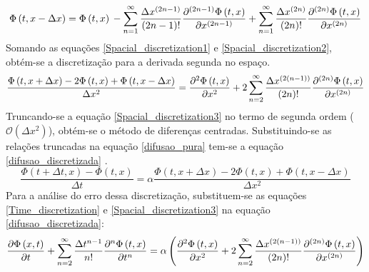 \documentclass[10pt,twoside,a4paper]{article}
\begin{document}
\begin{equation} \label{Spacial_discretization2}
	\Phi \left(t, x-\Delta x\right)= \Phi \left(t, x\right) \\
	 -\sum\limits_{n=1}^{\infty} \frac{\Delta x^{\left(2n-1\right)}}{\left(2n-1\right)!} \frac{\partial^{\left(2n-1\right)} \Phi \left(t, x\right)}{\partial x^{\left(2n-1\right)}}\\
	 +\sum\limits_{n=1}^{\infty} \frac{\Delta x^{\left(2n\right)}}{\left(2n\right)!} \frac{\partial^{\left(2n\right)} \Phi \left(t, x\right)}{\partial x^{\left(2n\right)}}
\end{equation}
Somando as equações \ref{Spacial_discretization1} e \ref{Spacial_discretization2}, obtém-se a discretização para a derivada segunda no espaço.
\begin{equation} \label{Spacial_discretization3}
\frac{\Phi \left(t, x+\Delta x\right)-2 \Phi \left(t, x\right) + \Phi \left(t, x-\Delta x\right)}{\Delta x^2} = \\
\frac{\partial^{2} \Phi \left(t, x\right)}{\partial x^{2}}+ \\
2 \sum\limits_{n=2}^{\infty} \frac{ \Delta x^{\left(2\left(n-1\right)\right)}}{\left(2n\right)!} \frac{\partial^{\left(2n\right)} \Phi \left(t, x\right)}{\partial x^{\left(2n\right)}}
\end{equation}
Truncando-se a equação \ref{Spacial_discretization3} no termo de segunda ordem ($\mathcal{O}(\Delta x^2)$), obtém-se o método de diferenças centradas.
Substituindo-se as relações truncadas na equação \ref{difusao_pura} tem-se a equação \ref{difusao_discretizada} .
\begin{equation} \label{difusao_discretizada}
\frac{\Phi \left(t+\Delta t, x\right)-\Phi \left(t, x\right)}{\Delta t}= \alpha \frac{\Phi \left(t, x+\Delta x\right)-2 \Phi \left(t, x\right) + \Phi \left(t, x-\Delta x\right)}{\Delta x^2}%
\end{equation}
Para a análise do erro dessa discretização, substituem-se as equações \ref{Time_discretization} e \ref{Spacial_discretization3} na equação \ref{difusao_discretizada}:
\begin{equation} \label{difusao_discretizada_modificada}
\frac{\partial \Phi \left( x,t \right)}{\partial t} + \sum\limits_{n=2}^{\infty} \frac{\Delta t^{n-1}}{n!} \frac{\partial^{n} \Phi\left(t, x\right)}{\partial t^{n}} = \alpha \left(\frac{\partial^{2} \Phi \left(t, x\right)}{\partial x^{2}}+ \\
2 \sum\limits_{n=2}^{\infty} \frac{ \Delta x^{\left(2\left(n-1\right)\right)}}{\left(2n\right)!} \frac{\partial^{\left(2n\right)} \Phi \left(t, x\right)}{\partial x^{\left(2n\right)}}\right)%
\end{equation}
\end{document}
